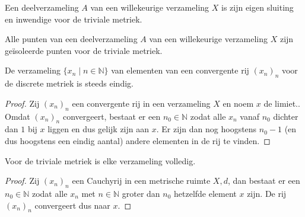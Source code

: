 \documentclass[main.tex]{subfiles}
\begin{document}
\begin{st}
  Een deelverzameling $A$ van een willekeurige verzameling $X$ is zijn eigen sluiting en inwendige voor de triviale metriek.
\end{st}

\begin{st}
  Alle punten van een deelverzameling $A$ van een willekeurige verzameling $X$ zijn ge\"isoleerde punten voor de triviale metriek.
\end{st}

\begin{st}
  De verzameling $\{ x_{n} \mid n\in \mathbb{N} \}$ van elementen van een convergente rij $(x_{n})_{n}$ voor de discrete metriek is steeds eindig.

  \begin{proof}
    Zij $(x_{n})_{n}$ een convergente rij in een verzameling $X$ en noem $x$ de limiet..
    Omdat $(x_{n})_{n}$ convergeert, bestaat er een $n_{0}\in \mathbb{N}$ zodat alle $x_{n}$ vanaf $n_{0}$ dichter dan $1$ bij $x$ liggen en dus gelijk zijn aan $x$.
    Er zijn dan nog hoogstens $n_{0}-1$ (en dus hoogstens een eindig aantal) andere elementen in de rij te vinden.
  \end{proof}
\end{st}

\begin{st}
  Voor de triviale metriek is elke verzameling volledig.

  \begin{proof}
    Zij $(x_{n})_{n}$ een Cauchyrij in een metrische ruimte $X,d$, dan bestaat er een $n_{0} \in \mathbb{N}$ zodat alle $x_{n}$ met $n\in \mathbb{N}$ groter dan $n_{0}$ hetzelfde element $x$ zijn.
    De rij $(x_{n})_{n}$ convergeert dus naar $x$.
  \end{proof}
\end{st}
\end{document}
